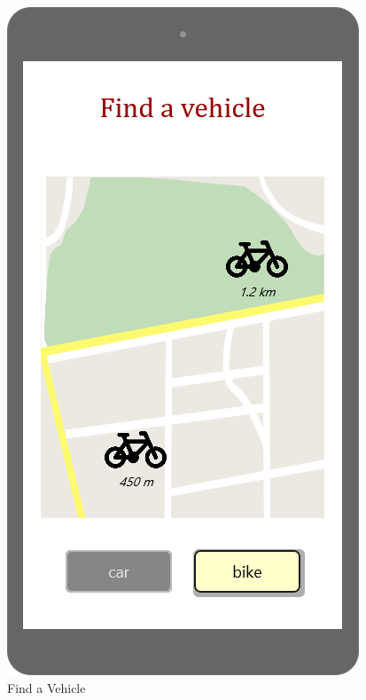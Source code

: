 \documentclass{article}
\begin{document}
\begin{figure}[H]
  \includegraphics[width=\linewidth]{05-Find_a_vehicle.png}
  \caption{Find a Vehicle}\label{fig:MU14}
\endminipage\hfill
{}

\end{figure}
\end{document}
